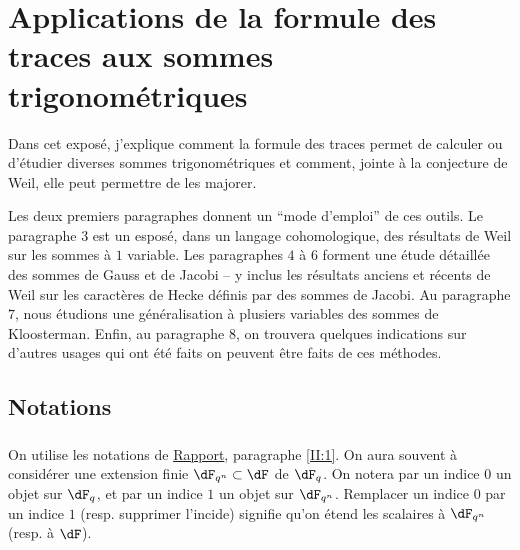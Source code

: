 
\chapter{Applications de la formule des traces aux sommes trigonométriques}\label{VI}










Dans cet expos\'e, j'explique comment la formule des traces permet de calculer 
ou d'\'etudier diverses sommes trigonom\'etriques et comment, jointe \`a la 
conjecture de Weil, elle peut permettre de les majorer.

Les deux premiers paragraphes donnent un ``mode d'emploi'' de ces outils. Le 
paragraphe 3 est un espos\'e, dans un langage cohomologique, des r\'esultats de 
Weil sur les sommes \`a $1$ variable. Les paragraphes $4$ \`a $6$ forment une 
\'etude d\'etaill\'ee des sommes de Gauss et de Jacobi -- y inclus les 
r\'esultats anciens et r\'ecents de Weil sur les caract\`eres de Hecke 
d\'efinis par des sommes de Jacobi. Au paragraphe $7$, nous \'etudions une 
g\'en\'eralisation \`a plusiers variables des sommes de Kloosterman. Enfin, au 
paragraphe $8$, on trouvera quelques indications sur d'autres usages qui ont 
\'et\'e faits on peuvent \^etre faits de ces m\'ethodes. 










\section*{Notations}\label{VI:0}





\subsection{}\label{VI:0-1}

On utilise les notations de \hyperref[II]{Rapport}, paragraphe \ref{II:1}. On 
aura souvent \`a consid\'erer une extension finie $\dF_{q^n}\subset \dF$ de 
$\dF_q$. On notera par un indice $0$ un objet sur $\dF_q$, et par un indice $1$ 
un objet sur $\dF_{q^n}$. Remplacer un indice $0$ par un indice $1$ (resp. 
supprimer l'incide) signifie qu'on \'etend les scalaires \`a $\dF_{q^n}$ (resp. 
\`a $\dF$).





